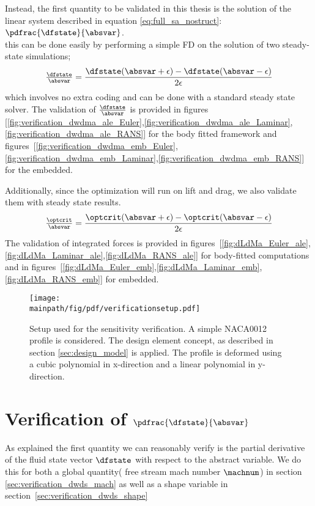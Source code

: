 \documentclass[../main.tex]{subfiles}
\begin{document}
Instead, the first quantity to be validated in this thesis is the solution of the linear system described in equation \eqref{eq:full_sa_nostruct}: $\pdfrac{\dfstate}{\absvar}$.\\
this can be done easily by performing a simple \ac{FD} on the solution of two steady-state simulations;
\begin{align}
\tfrac{\dfstate}{\absvar}=\frac{\dfstate(\absvar+\epsilon)-\dfstate(\absvar-\epsilon)}{2 \epsilon}
\end{align}
which involves no extra coding and can be done with a standard steady state solver.
The validation of $\tfrac{\dfstate}{\absvar}$ is provided in figures [\ref{fig:verification_dwdma_ale_Euler},\ref{fig:verification_dwdma_ale_Laminar},\ref{fig:verification_dwdma_ale_RANS}] for the body fitted framework and figures~[\ref{fig:verification_dwdma_emb_Euler},\ref{fig:verification_dwdma_emb_Laminar},\ref{fig:verification_dwdma_emb_RANS}] for the embedded.

Additionally, since the optimization will run on lift and drag, we also validate them with steady state results.
\begin{align}
\tfrac{\optcrit}{\absvar}=\frac{\optcrit(\absvar+\epsilon)-\optcrit(\absvar-\epsilon)}{2 \epsilon}
\end{align}
The validation of integrated forces is provided in figures~[\ref{fig:dLdMa_Euler_ale},\ref{fig:dLdMa_Laminar_ale},\ref{fig:dLdMa_RANS_ale}] for body-fitted computations and in figures~[\ref{fig:dLdMa_Euler_emb},\ref{fig:dLdMa_Laminar_emb},\ref{fig:dLdMa_RANS_emb}] for embedded.



\begin{figure}
\centering
\texttt{[image: \\mainpath/fig/pdf/verificationsetup.pdf]}
\caption[Verification setup]{Setup used for the sensitivity verification. A simple NACA0012 profile is considered. The design element concept, as described in section \ref{sec:design_model} is applied. The profile is deformed using a cubic polynomial in x-direction and a linear polynomial in y-direction.}
\label{fig:verification_setup}
\end{figure}

\section{Verification of $\pdfrac{\dfstate}{\absvar}$}\label{sec:verification_dwds}
As explained the first quantity we can reasonably verify is the partial derivative of the fluid state vector $\dfstate$ with respect to the abstract variable. We do this for both a global quantity( free stream mach number $\machnum$) in section \ref{sec:verification_dwds_mach} as well as a shape variable in section~\ref{sec:verification_dwds_shape}
\end{document}
